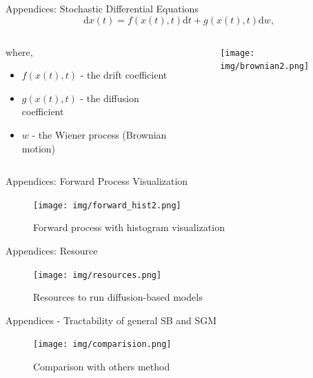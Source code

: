 \begin{frame}{Appendices: Stochastic Differential Equations}
    $$\mathrm{d}x(t) = f(x(t),t)\mathrm{d}t + g(x(t),t)\mathrm{d}w,$$
     \begin{columns}[t]
    \begin{column}{0.4\textwidth}
    where,
        \begin{itemize}
            \item $f(x(t),t)$ - the drift coefficient
            \item $g(x(t),t)$ - the diffusion coefficient
            \item $w$ - the Wiener process (Brownian motion)
        \end{itemize}  
    \end{column}
    \begin{column}{0.7\textwidth}
        \begin{figure}
            \centering
            \texttt{[image: img/brownian2.png]}
            \label{fig:enter-label}
        \end{figure}
    \end{column}
\end{columns}
\end{frame}

\begin{frame}{Appendices: Forward Process Visualization}
    \begin{figure}
        \centering
        \texttt{[image: img/forward\_hist2.png]}
        \caption{Forward process with histogram visualization}
        \label{fig:enter-label}
    \end{figure}
\end{frame}

\begin{frame}{Appendices: Resource}
\begin{figure}
    \centering
    \texttt{[image: img/resources.png]}
    \caption{Resources to run diffusion-based models\footnotemark[1]}
    \label{fig:original}
\end{figure}
\end{frame}

\begin{frame}{Appendices - Tractability of general SB and SGM}
\begin{figure}
    \centering
    \texttt{[image: img/comparision.png]}
    \caption{Comparison with others method\footnotemark[1]}
    \label{fig:original}
\end{figure}
\end{frame}

